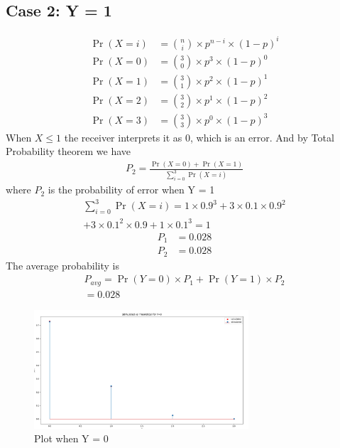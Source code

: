 \documentclass[journal,12pt,twocolumn]{IEEEtran}
\begin{document}
\subsection*{Case 2: Y = 1}
\begin{align}
\Pr(X = i) &= \binom{n}{i}\times p^{n-i}\times (1-p)^i\\
\Pr(X = 0) &= \binom{3}{0}\times p^3\times (1-p)^{0}\\
\Pr(X = 1) &= \binom{3}{1}\times p^2\times (1-p)^{1}\\
\Pr(X = 2) &= \binom{3}{2}\times p^1\times (1-p)^{2}\\
\Pr(X = 3) &= \binom{3}{3}\times p^0\times (1-p)^{3}
\end{align}
When $X \leq 1 $ the receiver interprets it as 0, which is an error. And by Total Probability theorem we have
\begin{align}
P_2 = \frac{\Pr(X = 0) + \Pr(X = 1)}{\sum_{i=0}^3\Pr(X = i)}
\end{align}
where $P_2$ is the probability of error when Y = 1
\begin{multline}
\sum_{i=0}^3\Pr(X = i) = 1\times 0.9^3 + 3\times 0.1\times 0.9^2 \\
+ 3\times 0.1^2 \times 0.9 + 1\times 0.1^3 = 1
\end{multline}
\begin{align}
P_1 &= 0.028\\
P_2 &= 0.028
\end{align}
The average probability is 
\begin{multline}
P_{avg} = \Pr(Y = 0)\times P_1 +\Pr(Y = 1)\times P_2\\ = 0.028 \end{multline}
\begin{table}[H]
\centering
{}
\caption{Probability of number of 1's recieved  }
\label{table:1}
\end{table}
\begin{figure}[htp]
    \centering
    \includegraphics[width=8cm]{assignment2_plot1}
    \caption{Plot when Y = 0}
    \label{fig:1}
\end{figure}
\end{document}
